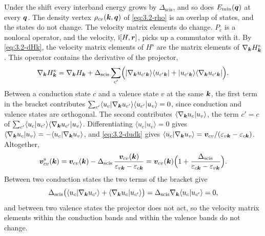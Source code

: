 Under the shift every interband energy grows by $\Delta_{\mathrm{scis}}$, and so does $E_{\mathrm{min}}(\bm{q})$ at every $\bm{q}$. The density vertex $\rho_{cv}(\bm{k}, \bm{q})$ of \cref{eq:3.2-rho} is an overlap of states, and the states do not change. The velocity matrix elements do change. $P_{\mathrm{c}}$ is a nonlocal operator, and the velocity, $\mathrm{i}[H, \bm{r}]$, picks up a commutator with it. By \cref{eq:3.2-dHk}, the velocity matrix elements of $H^{\mathrm{s}}$ are the matrix elements of $\nabla_{\bm{k}}H^{\mathrm{s}}_{\bm{k}}$. This operator contains the derivative of the projector,
\begin{equation*}
  \nabla_{\bm{k}}H^{\mathrm{s}}_{\bm{k}} = \nabla_{\bm{k}}H_{\bm{k}} + \Delta_{\mathrm{scis}}\sum_{c'}\Bigl(|\nabla_{\bm{k}}u_{c'\bm{k}}\rangle\langle u_{c'\bm{k}}| + |u_{c'\bm{k}}\rangle\langle\nabla_{\bm{k}}u_{c'\bm{k}}|\Bigr) .
\end{equation*}
Between a conduction state $c$ and a valence state $v$ at the same $\bm{k}$, the first term in the bracket contributes $\sum_{c'}\langle u_c|\nabla_{\bm{k}}u_{c'}\rangle\langle u_{c'}|u_v\rangle = 0$, since conduction and valence states are orthogonal. The second contributes $\langle\nabla_{\bm{k}}u_c|u_v\rangle$, the term $c' = c$ of $\sum_{c'}\langle u_c|u_{c'}\rangle\langle\nabla_{\bm{k}}u_{c'}|u_v\rangle$. Differentiating $\langle u_c|u_v\rangle = 0$ gives $\langle\nabla_{\bm{k}}u_c|u_v\rangle = -\langle u_c|\nabla_{\bm{k}}u_v\rangle$, and \cref{eq:3.2-dudk} gives $\langle u_c|\nabla_{\bm{k}}u_v\rangle = \bm{v}_{cv}/(\varepsilon_{v\bm{k}} - \varepsilon_{c\bm{k}})$. Altogether,
\begin{equation*}
  \bm{v}^{\mathrm{s}}_{cv}(\bm{k}) = \bm{v}_{cv}(\bm{k}) - \Delta_{\mathrm{scis}}\,\frac{\bm{v}_{cv}(\bm{k})}{\varepsilon_{v\bm{k}} - \varepsilon_{c\bm{k}}}
  = \bm{v}_{cv}(\bm{k})\Bigl(1 + \frac{\Delta_{\mathrm{scis}}}{\varepsilon_{c\bm{k}} - \varepsilon_{v\bm{k}}}\Bigr) .
\end{equation*}
Between two conduction states the two terms of the bracket give
\begin{equation*}
  \Delta_{\mathrm{scis}}\bigl(\langle u_c|\nabla_{\bm{k}}u_{c'}\rangle + \langle\nabla_{\bm{k}}u_c|u_{c'}\rangle\bigr) = \Delta_{\mathrm{scis}}\nabla_{\bm{k}}\langle u_c|u_{c'}\rangle = 0 ,
\end{equation*}
and between two valence states the projector does not act, so the velocity matrix elements within the conduction bands and within the valence bands do not change.
